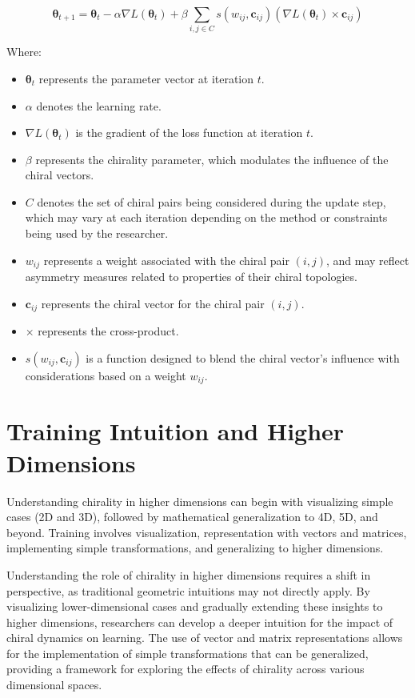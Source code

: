 \documentclass[12pt, a4paper]{article}
\begin{document}
\begin{equation} \label{eq:cgd_sigmoid}
\boldsymbol{\theta}_{t+1} = \boldsymbol{\theta}_t - \alpha \nabla L(\boldsymbol{\theta}_t) + \beta \sum_{i,j \in C} s(w_{ij}, \mathbf{c}_{ij}) (\nabla L(\boldsymbol{\theta}_t) \times \mathbf{c}_{ij})
\end{equation}

Where:
\begin{itemize}
    \item \(\boldsymbol{\theta}_t\) represents the parameter vector at iteration \(t\).
    \item \(\alpha\) denotes the learning rate.
    \item \(\nabla L(\boldsymbol{\theta}_t)\) is the gradient of the loss function at iteration \(t\).
    \item \(\beta\) represents the chirality parameter, which modulates the influence of the chiral vectors.
    \item \(C\) denotes the set of chiral pairs being considered during the update step, which may vary at each iteration depending on the method or constraints being used by the researcher.
    \item \(w_{ij}\) represents a weight associated with the chiral pair \((i,j)\), and may reflect asymmetry measures related to properties of their chiral topologies.
    \item \(\mathbf{c}_{ij}\) represents the chiral vector for the chiral pair \((i, j)\).
    \item \(\times\) represents the cross-product.
    \item \(s(w_{ij},\mathbf{c}_{ij})\) is a function designed to blend the chiral vector's influence with considerations based on a weight \(w_{ij}\).
\end{itemize}

\section{Training Intuition and Higher Dimensions}
Understanding chirality in higher dimensions can begin with visualizing simple cases (2D and 3D), followed by mathematical generalization to 4D, 5D, and beyond. Training involves visualization, representation with vectors and matrices, implementing simple transformations, and generalizing to higher dimensions.

Understanding the role of chirality in higher dimensions requires a shift in perspective, as traditional geometric intuitions may not directly apply. By visualizing lower-dimensional cases and gradually extending these insights to higher dimensions, researchers can develop a deeper intuition for the impact of chiral dynamics on learning. The use of vector and matrix representations allows for the implementation of simple transformations that can be generalized, providing a framework for exploring the effects of chirality across various dimensional spaces.
\end{document}
